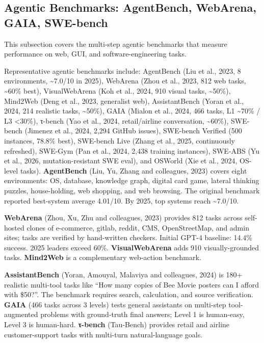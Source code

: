 \subsection{Agentic Benchmarks: AgentBench, WebArena, GAIA, SWE-bench}\label{agentic-benchmarks-agentbench-webarena-gaia-swe-bench}

This subsection covers the multi-step agentic benchmarks that measure performance on web, GUI, and software-engineering tasks.

Representative agentic benchmarks include: AgentBench (Liu et al., 2023, 8 environments, \textasciitilde7.0/10 in 2025), WebArena (Zhou et al., 2023, 812 web tasks, \textasciitilde60\% best), VisualWebArena (Koh et al., 2024, 910 visual tasks, \textasciitilde50\%), Mind2Web (Deng et al., 2023, generalist web), AssistantBench (Yoran et al., 2024, 214 realistic tasks, \textasciitilde50\%), GAIA (Mialon et al., 2024, 466 tasks, L1 \textasciitilde70\% / L3 \textless30\%), τ-bench (Yao et al., 2024, retail/airline conversation, \textasciitilde60\%), SWE-bench (Jimenez et al., 2024, 2,294 GitHub issues), SWE-bench Verified (500 instances, 78.8\% best), SWE-bench Live (Zhang et al., 2025, continuously refreshed), SWE-Gym (Pan et al., 2024, 2,438 training instances), SWE-ABS (Yu et al., 2026, mutation-resistant SWE eval), and OSWorld (Xie et al., 2024, OS-level tasks). \textbf{AgentBench} (Liu, Yu, Zhang and colleagues, 2023) covers eight environments: OS, database, knowledge graph, digital card game, lateral thinking puzzles, house-holding, web shopping, and web browsing. The original benchmark reported best-system average 4.01/10. By 2025, top systems reach \textasciitilde7.0/10.

\textbf{WebArena} (Zhou, Xu, Zhu and colleagues, 2023) provides 812 tasks across self-hosted clones of e-commerce, gitlab, reddit, CMS, OpenStreetMap, and admin sites; tasks are verified by hand-written checkers. Initial GPT-4 baseline: 14.4\% success. 2025 leaders exceed 60\%. \textbf{VisualWebArena} adds 910 visually-grounded tasks. \textbf{Mind2Web} is a complementary web-action benchmark.

\textbf{AssistantBench} (Yoran, Amouyal, Malaviya and colleagues, 2024) is 180+ realistic multi-tool tasks like ``How many copies of Bee Movie posters can I afford with \$50?''. The benchmark requires search, calculation, and source verification. \textbf{GAIA} (466 tasks across 3 levels) tests general assistants on multi-step tool-augmented problems with ground-truth final answers; Level 1 is human-easy, Level 3 is human-hard. \textbf{τ-bench} (Tau-Bench) provides retail and airline customer-support tasks with multi-turn natural-language goals.

